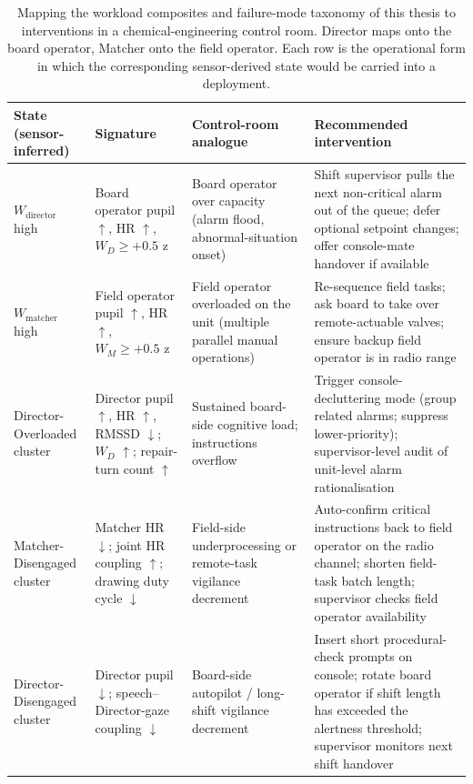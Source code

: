 \begin{table}[!ht]
\caption[Workload composites and failure modes mapped to control-room interventions]{Mapping the workload composites and failure-mode taxonomy of this thesis to interventions in a chemical-engineering control room. Director maps onto the board operator, Matcher onto the field operator. Each row is the operational form in which the corresponding sensor-derived state would be carried into a deployment.}
\label{tab:cheme-mapping}
\centering
\small
\begin{tabular}{p{2.8cm}p{3.0cm}p{3.5cm}p{4.6cm}}
\toprule
State (sensor-inferred) & Signature & Control-room analogue & Recommended intervention \\
\midrule
$W_{\text{director}}$ high & Board operator pupil $\uparrow$, HR $\uparrow$, $W_D \geq +0.5$ z & Board operator over capacity (alarm flood, abnormal-situation onset) & Shift supervisor pulls the next non-critical alarm out of the queue; defer optional setpoint changes; offer console-mate handover if available \\
$W_{\text{matcher}}$ high & Field operator pupil $\uparrow$, HR $\uparrow$, $W_M \geq +0.5$ z & Field operator overloaded on the unit (multiple parallel manual operations) & Re-sequence field tasks; ask board to take over remote-actuable valves; ensure backup field operator is in radio range \\
Director-Overloaded cluster & Director pupil $\uparrow$, HR $\uparrow$, RMSSD $\downarrow$; $W_D$ $\uparrow$; repair-turn count $\uparrow$ & Sustained board-side cognitive load; instructions overflow & Trigger console-decluttering mode (group related alarms; suppress lower-priority); supervisor-level audit of unit-level alarm rationalisation \cite{bullemer1996abnormal,nimmo1998abnormal} \\
Matcher-Disengaged cluster & Matcher HR $\downarrow$; joint HR coupling $\uparrow$; drawing duty cycle $\downarrow$ & Field-side underprocessing or remote-task vigilance decrement & Auto-confirm critical instructions back to field operator on the radio channel; shorten field-task batch length; supervisor checks field operator availability \\
Director-Disengaged cluster & Director pupil $\downarrow$; speech--Director-gaze coupling $\downarrow$ & Board-side autopilot / long-shift vigilance decrement & Insert short procedural-check prompts on console; rotate board operator if shift length has exceeded the alertness threshold; supervisor monitors next shift handover \\

\end{tabular}
\end{table}

